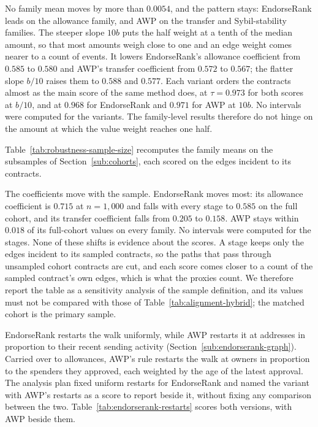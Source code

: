 No family mean moves by more than $0.0054$, and the pattern stays: EndorseRank leads on the allowance family, and AWP on the transfer and Sybil-stability families. The steeper slope $10b$ puts the half weight at a tenth of the median amount, so that most amounts weigh close to one and an edge weight comes nearer to a count of events. It lowers EndorseRank's allowance coefficient from $0.585$ to $0.580$ and AWP's transfer coefficient from $0.572$ to $0.567$; the flatter slope $b/10$ raises them to $0.588$ and $0.577$. Each variant orders the contracts almost as the main score of the same method does, at $\tau=0.973$ for both scores at $b/10$, and at $0.968$ for EndorseRank and $0.971$ for AWP at $10b$. No intervals were computed for the variants. The family-level results therefore do not hinge on the amount at which the value weight reaches one half.


Table~\ref{tab:robustness-sample-size} recomputes the family means on the subsamples of Section~\ref{sub:cohorts}, each scored on the edges incident to its contracts.



The coefficients move with the sample. EndorseRank moves most: its allowance coefficient is $0.715$ at $n=1{,}000$ and falls with every stage to $0.585$ on the full cohort, and its transfer coefficient falls from $0.205$ to $0.158$. AWP stays within $0.018$ of its full-cohort values on every family. No intervals were computed for the stages. None of these shifts is evidence about the scores. A stage keeps only the edges incident to its sampled contracts, so the paths that pass through unsampled cohort contracts are cut, and each score comes closer to a count of the sampled contract's own edges, which is what the proxies count. We therefore report the table as a sensitivity analysis of the sample definition, and its values must not be compared with those of Table~\ref{tab:alignment-hybrid}; the matched cohort is the primary sample.


EndorseRank restarts the walk uniformly, while AWP restarts it at addresses in proportion to their recent sending activity (Section~\ref{sub:endorserank-graph}). Carried over to allowances, AWP's rule restarts the walk at owners in proportion to the spenders they approved, each weighted by the age of the latest approval. The analysis plan fixed uniform restarts for EndorseRank and named the variant with AWP's restarts as a score to report beside it, without fixing any comparison between the two. Table~\ref{tab:endorserank-restarts} scores both versions, with AWP beside them.


